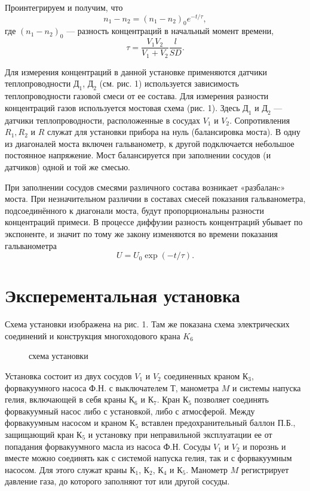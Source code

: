 \documentclass[a4paper,12pt]{article}
\begin{document}
Проинтегрируем и получим, что $$n_1-n_2=(n_1-n_2)_0 e^{-t/\tau},$$ где $(n_1-
n_2)_0$ — разность концентраций в начальный момент времени, $$\tau=\frac{V_1V_2}{V_1+V_2}\frac{l}{SD}.$$

Для измерения концентраций в данной установке применяются датчики теплопроводности $Д_1$, $Д_2$ (см. рис. 1) используется зависимость теплопроводности газовой смеси от ее состава.
Для измерения разности концентраций газов используется мостовая схема (рис. 1). Здесь $Д_1$ и $Д_2$ — датчики теплопроводности, расположенные в сосудах $V_1$ и $V_2$. Сопротивления $R_1, R_2$ и $R$ служат для установки прибора на нуль (балансировка моста). В одну из диагоналей моста включен гальванометр, к другой подключается небольшое постоянное напряжение. Мост балансируется при заполнении сосудов (и датчиков) одной и той же смесью.

При заполнении сосудов смесями различного состава возникает «разбаланc» моста. При незначительном различии в составах смесей показания гальванометра, подсоединённого к диагонали моста, будут пропорциональны разности концентраций примеси. В процессе диффузии
разность концентраций убывает по экспоненте, и значит по тому же закону изменяются во времени показания гальванометра $$U=U_0 \exp(-t/\tau).$$
\section*{Эксперементальная установка}
Схема установки изображена на рис. 1. Там же показана схема электрических соединений и конструкция многоходового крана $K_6$

\begin{figure}[h]
	\caption{схема установки}
\end{figure}
Установка состоит из двух сосудов $V_1$ и $V_2$ соединенных краном $К_3$, форвакуумного насоса Ф.Н. с выключателем $Т$, манометра $M$ и системы напуска гелия, включающей в себя краны $К_6$ и $К_7$. Кран $К_5$ позволяет соединять форвакуумный насос либо с установкой, либо с атмосферой. Между форвакуумным насосом и краном $К_5$ вставлен предохранительный баллон П.Б., защищающий кран $К_5$ и установку при неправильной эксплуатации ее от попадания форвакуумного масла из насоса Ф.Н. Сосуды $V_1$ и $V_2$ и порознь и вместе можно соединять как с системой напуска гелия, так и с форвакуумным насосом. Для этого служат краны $К_1$, $К_2$, $К_4$ и $К_5$. Манометр  $M$
регистрирует давление газа, до которого заполняют тот или другой
сосуды.
\end{document}
